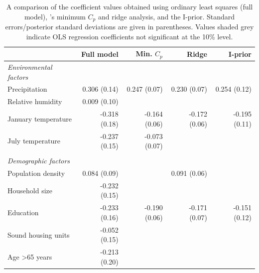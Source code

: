 \documentclass[showframe,11pt,twoside,openright]{report}
\begin{document}
\begin{table}[htb]
\centering
\caption[Results for the mortality and air pollution BVS model.]{A comparison of the coefficient values obtained using ordinary least squares (full model), \citeauthor{McDonald1973}'s minimum $C_p$ and ridge analysis, and the I-prior. Standard errors/posterior standard deviations are given in parentheses. Values shaded grey indicate OLS regression coefficients not significant at the 10\% level.}
\label{tab:poll}
\begin{tabular}{lrrrr}
\toprule
& Full model & Min. $C_p$ & Ridge  & I-prior \\ \midrule
\emph{Environmental factors} \\
\hspace{0.5em} Precipitation            & 0.306 (0.14)                 & 0.247 (0.07)   & 0.230 (0.07)      & 0.254 (0.12)       \\
\hspace{0.5em} Relative humidity        & {\color{grymath} 0.009 (0.10)}  &                &                   &         \\
\hspace{0.5em} January temperature      & {\color{grymath} -0.318 (0.18)} & -0.164 (0.06)  & -0.172 (0.06)     & -0.195 (0.11)        \\
\hspace{0.5em} July temperature         & {\color{grymath} -0.237 (0.15)} & -0.073 (0.07)  &                   &         \\
\\
\emph{Demographic factors} \\
\hspace{0.5em} Population density       & {\color{grymath} 0.084 (0.09)}  &                & 0.091 (0.06)      &         \\
\hspace{0.5em} Household size & {\color{grymath} -0.232 (0.15)} &                &                   &         \\
\hspace{0.5em} Education                & {\color{grymath} -0.233 (0.16)} & -0.190 (0.06)  & -0.171 (0.07)     & -0.151 (0.12)        \\
\hspace{0.5em} Sound housing units   & {\color{grymath} -0.052 (0.15)} &                &                   &         \\
\hspace{0.5em} Age >65 years     & {\color{grymath} -0.213 (0.20)} &                &                   &         \\

\end{tabular}
\end{table}
\end{document}
